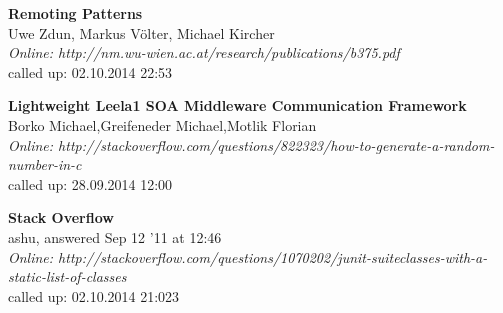 \documentclass[a4paper]{article}
\begin{document}
\newpage
\listoffigures

\begin{thebibliography}{56}

	\textbf{Remoting Patterns} \\
   Uwe Zdun, Markus Völter, Michael Kircher\\
  \emph{Online: 	http://nm.wu-wien.ac.at/research/publications/b375.pdf}\\
  called up: 02.10.2014 22:53

	\textbf{Lightweight Leela1 SOA Middleware
Communication Framework} \\
  Borko Michael,Greifeneder Michael,Motlik Florian \\
  \emph{Online: 	http://stackoverflow.com/questions/822323/how-to-generate-a-random-number-in-c}\\
  called up: 28.09.2014 12:00
  
	\textbf{Stack Overflow} \\
   ashu, answered Sep 12 '11 at 12:46\\
  \emph{Online: 	http://stackoverflow.com/questions/1070202/junit-suiteclasses-with-a-static-list-of-classes}\\
  called up: 02.10.2014 21:023

\end{thebibliography}             
\end{document}
